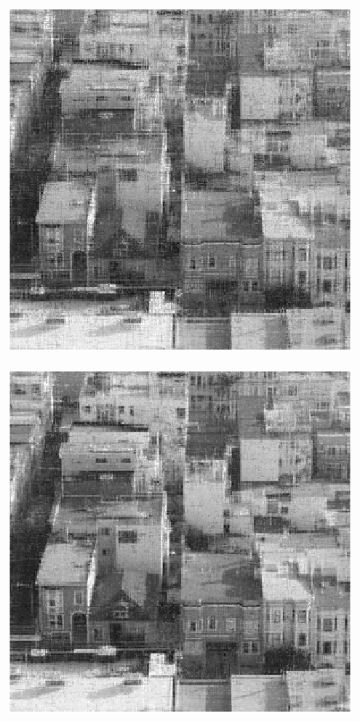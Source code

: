 \begin{figure}
    \begin{subfigure}{0.325\linewidth}
        \includegraphics[width=\linewidth]{Poglavja/Slike/kompleksna grayscale 300/rez35TNNM.png}
    \end{subfigure}
    \hfill
    \begin{subfigure}{0.325\linewidth}
        \includegraphics[width=\linewidth]{Poglavja/Slike/kompleksna grayscale 300/rez45TNNM.png}

\end{subfigure}
\end{figure}
